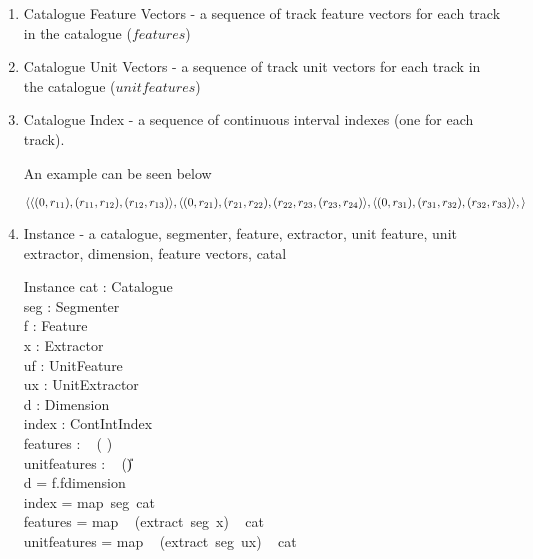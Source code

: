 \documentclass[11pt]{article}
\begin{document}
\begin{enumerate}
\item \textsf{Catalogue Feature Vectors}  - a sequence of track feature vectors for each track in the catalogue ($features$)

\item  \textsf{Catalogue Unit Vectors}  - a sequence of track unit vectors for each track in the catalogue ($unitfeatures$)

\item \textsf{Catalogue Index} - a sequence of continuous interval indexes (one for each track).

An example can be seen below

\[ \langle 
\langle (0,r_{11}), (r_{11},r_{12}), (r_{12}, r_{13}) \rangle, \\ 
\langle (0,r_{21}), (r_{21},r_{22}), (r_{22}, r_{23}, (r_{23}, r_{24}) \rangle, \\ 
\langle (0,r_{31}), (r_{31},r_{32}), (r_{32}, r_{33}) \rangle, \\
\rangle \]

\item \textsf{Instance} - a catalogue, segmenter, feature, extractor, unit  feature, unit extractor, dimension, feature vectors, catal


\begin{schema}{Instance} 
	cat : Catalogue 				\\
	seg : Segmenter  			\\ 
	f : Feature 				\\  
	x : Extractor				\\			
	uf : UnitFeature			\\
	ux : UnitExtractor			\\
	d : Dimension 				\\
	index : \seq ContIntIndex \\
	features  :  \seq ~ (	\seq 	\V) \\
	unitfeatures : \seq ~ (\seq 	\U)  \\
\where
	d = f.fdimension \\
	index = map~seg~cat \\
	features = map ~ (extract~seg~x) ~ cat \\  
	unitfeatures =  map ~ (extract~seg~ux) ~ cat  \\     
\end{schema}	


\end{enumerate}
\end{document}
